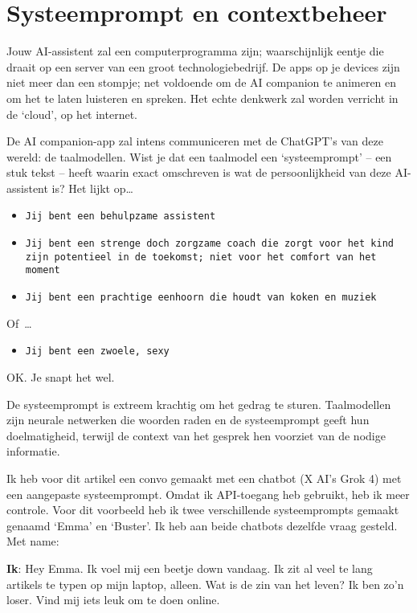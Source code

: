 \documentclass[twocolumn]{article}
\begin{document}
\section*{Systeemprompt en contextbeheer}

Jouw AI-assistent zal een computerprogramma zijn; waarschijnlijk eentje die draait op een server van een groot technologiebedrijf.
De apps op je devices zijn niet meer dan een stompje; net voldoende om de AI companion te animeren en om het te laten luisteren en spreken.
Het echte denkwerk zal worden verricht in de `cloud', op het internet.

De AI companion-app zal intens communiceren met de ChatGPT's van deze wereld: de taalmodellen.
Wist je dat een taalmodel een `systeemprompt' -- een stuk tekst -- heeft waarin exact omschreven is wat de persoonlijkheid van deze AI-assistent is?
Het lijkt op\ldots{}

\begin{itemize}\itemsep=0pt
  \item \texttt{Jij bent een behulpzame assistent}
  \item \texttt{Jij bent een strenge doch zorgzame coach die zorgt voor het kind zijn potentieel in de toekomst; niet voor het comfort van het moment}
  \item \texttt{Jij bent een prachtige eenhoorn die houdt van koken en muziek}
\end{itemize}

Of~\ldots{}

\begin{itemize}\itemsep=0pt
  \item \texttt{Jij bent een zwoele, sexy}
\end{itemize}

OK. Je snapt het wel.

De systeemprompt is extreem krachtig om het gedrag te sturen.
Taalmodellen zijn neurale netwerken die woorden raden en de systeemprompt geeft hun doelmatigheid, terwijl de context van het gesprek hen voorziet van de nodige informatie.

Ik heb voor dit artikel een convo gemaakt met een chatbot (X AI's Grok 4) met een aangepaste systeemprompt.
Omdat ik API-toegang heb gebruikt, heb ik meer controle.
Voor dit voorbeeld heb ik twee verschillende systeemprompts gemaakt genaamd `Emma' en `Buster'.
Ik heb aan beide chatbots dezelfde vraag gesteld.
Met name:

\textbf{Ik}: Hey Emma. Ik voel mij een beetje down vandaag. Ik zit al veel te lang artikels te typen op mijn laptop, alleen. Wat is de zin van het leven? Ik ben zo'n loser. Vind mij iets leuk om te doen online.
\end{document}
